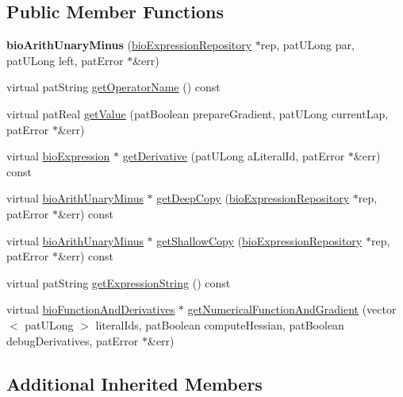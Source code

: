 \subsection*{Public Member Functions}
\begin{DoxyCompactItemize}
\item 
\mbox{\label{classbio_arith_unary_minus_aef0b0cea108500176219e8ab209012da}} 
{\bfseries bio\+Arith\+Unary\+Minus} (\hyperlink{classbio_expression_repository}{bio\+Expression\+Repository} $\ast$rep, pat\+U\+Long par, pat\+U\+Long left, pat\+Error $\ast$\&err)
\item 
virtual pat\+String \hyperlink{classbio_arith_unary_minus_a59b3bcf198b25bc802775014bfce2f21}{get\+Operator\+Name} () const
\item 
virtual pat\+Real \hyperlink{classbio_arith_unary_minus_a0a31abb1d5a352b933c2d07cb2c657c8}{get\+Value} (pat\+Boolean prepare\+Gradient, pat\+U\+Long current\+Lap, pat\+Error $\ast$\&err)
\item 
virtual \hyperlink{classbio_expression}{bio\+Expression} $\ast$ \hyperlink{classbio_arith_unary_minus_aaf1b155993a12037850b1a22dbb36f7c}{get\+Derivative} (pat\+U\+Long a\+Literal\+Id, pat\+Error $\ast$\&err) const
\item 
virtual \hyperlink{classbio_arith_unary_minus}{bio\+Arith\+Unary\+Minus} $\ast$ \hyperlink{classbio_arith_unary_minus_a1bd7f28b742866f8a8e84b5f8405fbd1}{get\+Deep\+Copy} (\hyperlink{classbio_expression_repository}{bio\+Expression\+Repository} $\ast$rep, pat\+Error $\ast$\&err) const
\item 
virtual \hyperlink{classbio_arith_unary_minus}{bio\+Arith\+Unary\+Minus} $\ast$ \hyperlink{classbio_arith_unary_minus_af7d31f14e0e619536f33c45fedb7fa79}{get\+Shallow\+Copy} (\hyperlink{classbio_expression_repository}{bio\+Expression\+Repository} $\ast$rep, pat\+Error $\ast$\&err) const
\item 
virtual pat\+String \hyperlink{classbio_arith_unary_minus_a2e8b40486ef897c00ce5a99e7f8ebd03}{get\+Expression\+String} () const
\item 
virtual \hyperlink{classbio_function_and_derivatives}{bio\+Function\+And\+Derivatives} $\ast$ \hyperlink{classbio_arith_unary_minus_a8fc3f51f45b38f8e710db12eec18b9fb}{get\+Numerical\+Function\+And\+Gradient} (vector$<$ pat\+U\+Long $>$ literal\+Ids, pat\+Boolean compute\+Hessian, pat\+Boolean debug\+Derivatives, pat\+Error $\ast$\&err)
\end{DoxyCompactItemize}
\subsection*{Additional Inherited Members}


